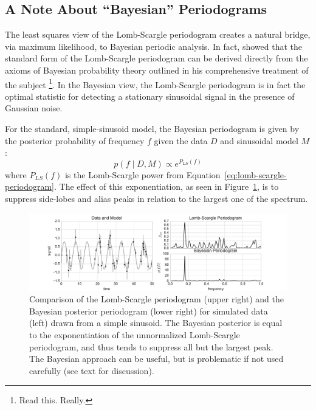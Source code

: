 \documentclass[preprint]{aastex}
\newcommand{\fig}[1]{Figure~\ref{fig:#1}}
\newcommand{\figlabel}[1]{\label{fig:#1}}
\newcommand{\Eq}[1]{Equation~\ref{eq:#1}}
\newcommand{\eq}[1]{\Eq{#1}}
\newcommand{\eqlabel}[1]{\label{eq:#1}}
\newcommand{\sectlabel}[1]{\label{sect:#1}}
\begin{document}
\subsection{A Note About ``Bayesian'' Periodograms}
\sectlabel{bayesian-periodograms}
The least squares view of the Lomb-Scargle periodogram creates a natural
bridge, via maximum likelihood, to Bayesian periodic analysis.
In fact, \citet{Jaynes87} showed that the standard form of the Lomb-Scargle
periodogram can be derived directly from the axioms of Bayesian probability
theory outlined in his comprehensive treatment of the subject
\citep{Jaynes03}\footnote{Read this. Really.}.
In the Bayesian view, the Lomb-Scargle periodogram is in fact the optimal
statistic for detecting a stationary sinusoidal signal in the presence of
Gaussian noise.

For the standard, simple-sinusoid model, the Bayesian periodogram is given by the posterior
probability of frequency $f$ given the data $D$ and sinusoidal model $M$:
\begin{equation}
  p(f\mid D, M) \propto e^{P_{LS}(f)}
  \eqlabel{bayesian-periodogram}
\end{equation}
where $P_{LS}(f)$ is the Lomb-Scargle power from \eq{lomb-scargle-periodogram}.
The effect of this exponentiation, as seen in \fig{bayesian-periodogram},
is to suppress side-lobes and alias peaks in relation to the largest one
of the spectrum.

\begin{figure}[ht]
  \centering
  \includegraphics[width=\textwidth]{fig24_bayesian_periodogram}
  \caption{Comparison of the Lomb-Scargle periodogram (upper right) and the
    Bayesian posterior periodogram (lower right) for simulated data (left)
    drawn from a simple sinusoid.
    The Bayesian posterior is equal to the exponentiation of the unnormalized
    Lomb-Scargle periodogram, and thus tends to suppress all but the largest
    peak. The Bayesian approach can be useful, but is problematic if
    not used carefully (see text for discussion).
    \figlabel{bayesian-periodogram}}
\end{figure}
\end{document}
